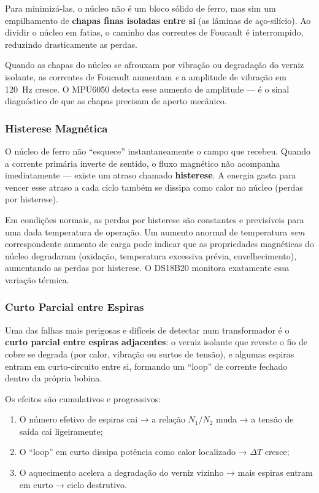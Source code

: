 \documentclass[12pt, a4paper]{article}
\begin{document}
Para minimizá-las, o núcleo não é um bloco sólido de ferro, mas sim um empilhamento de \textbf{chapas finas isoladas entre si} (as lâminas de aço-silício). Ao dividir o núcleo em fatias, o caminho das correntes de Foucault é interrompido, reduzindo drasticamente as perdas.

\begin{tcolorbox}[caixaInfo, title={Conexão com o MPU6050}]
Quando as chapas do núcleo se afrouxam por vibração ou degradação do verniz isolante, as correntes de Foucault aumentam \emph{e} a amplitude de vibração em 120~Hz cresce. O MPU6050 detecta esse aumento de amplitude --- é o sinal diagnóstico de que as chapas precisam de aperto mecânico.
\end{tcolorbox}

\subsubsection{Histerese Magnética}

O núcleo de ferro não ``esquece'' instantaneamente o campo que recebeu. Quando a corrente primária inverte de sentido, o fluxo magnético não acompanha imediatamente --- existe um atraso chamado \textbf{histerese}. A energia gasta para vencer esse atraso a cada ciclo também se dissipa como calor no núcleo (perdas por histerese).

Em condições normais, as perdas por histerese são constantes e previsíveis para uma dada temperatura de operação. Um aumento anormal de temperatura \emph{sem} correspondente aumento de carga pode indicar que as propriedades magnéticas do núcleo degradaram (oxidação, temperatura excessiva prévia, envelhecimento), aumentando as perdas por histerese. O DS18B20 monitora exatamente essa variação térmica.

\subsubsection{Curto Parcial entre Espiras}

Uma das falhas mais perigosas e difíceis de detectar num transformador é o \textbf{curto parcial entre espiras adjacentes}: o verniz isolante que reveste o fio de cobre se degrada (por calor, vibração ou surtos de tensão), e algumas espiras entram em curto-circuito entre si, formando um ``loop'' de corrente fechado dentro da própria bobina.

Os efeitos são cumulativos e progressivos:
\begin{enumerate}[leftmargin=2cm]
    \item O número efetivo de espiras cai → a relação $N_1/N_2$ muda → a tensão de saída cai ligeiramente;
    \item O ``loop'' em curto dissipa potência como calor localizado → $\Delta T$ cresce;
    \item O aquecimento acelera a degradação do verniz vizinho → mais espiras entram em curto → ciclo destrutivo.
\end{enumerate}
\end{document}
